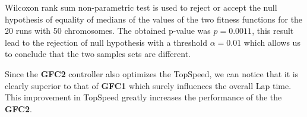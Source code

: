 \documentclass[conference]{IEEEtran}
\begin{document}
\begin{table*}[ht]
{{\begin{tabular}{|c||c|c|c|c||c|c|c|c|}
			\end{tabular}
		}\label{tab:runsresults}
	}
\end{table*}
Wilcoxon rank sum non-parametric test is used to reject or accept the
null hypothesis of equality of medians of the values of the two
fitness functions for the 20 runs with 50 chromosomes. The obtained
p-value was $p =  0.0011$, this result lead to the rejection of null
hypothesis with a threshold $\alpha=0.01$ which allows us to conclude
that the two samples sets are different. 

Since the \textbf{GFC2} controller also optimizes the TopSpeed, we can
notice that it is clearly superior to that of \textbf{GFC1} which
surely influences the overall Lap time. This improvement in TopSpeed
greatly increases the performance of the the \textbf{GFC2}.
\end{document}
